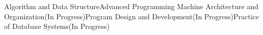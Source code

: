

\begin{cvparagraph}
Algorithm and Data Structure{\enskip\cdotp\enskip}Advanced Programming{\enskip\cdotp\enskip} Machine Architecture and Organization(In Progress){\enskip\cdotp\enskip}Program Design and Development(In Progress){\enskip\cdotp\enskip}Practice of Database Systems(In Progress)
\
\end{cvparagraph}

